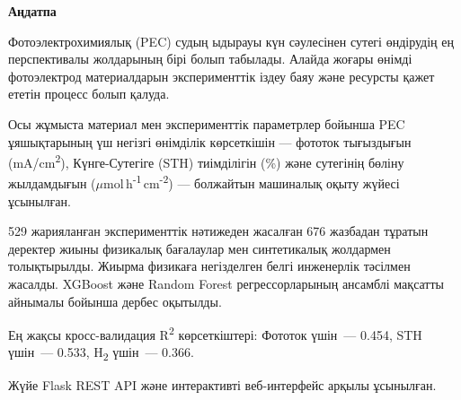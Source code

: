 \newpage
\pagestyle{plain}

{
\begin{center}
    \Large
    \textbf{Аңдатпа}
\end{center}

\vspace{0.5cm}

Фотоэлектрохимиялық (PEC) судың ыдырауы күн сәулесінен сутегі өндірудің ең перспективалы
жолдарының бірі болып табылады. Алайда жоғары өнімді фотоэлектрод материалдарын
эксперименттік іздеу баяу және ресурсты қажет ететін процесс болып қалуда.

Осы жұмыста материал мен эксперименттік параметрлер бойынша PEC ұяшықтарының үш
негізгі өнімділік көрсеткішін — фототок тығыздығын (mA/cm\textsuperscript{2}),
Күнге-Сутегіге (STH) тиімділігін (\%) және сутегінің бөліну жылдамдығын
($\mu$mol\,h\textsuperscript{-1}\,cm\textsuperscript{-2}) — болжайтын
машиналық оқыту жүйесі ұсынылған.

529 жарияланған эксперименттік нәтижеден жасалған 676 жазбадан тұратын деректер жиыны
физикалық бағалаулар мен синтетикалық жолдармен толықтырылды.
Жиырма физикаға негізделген белгі инженерлік тәсілмен жасалды.
XGBoost және Random Forest регрессорларының ансамблі мақсатты айнымалы бойынша
дербес оқытылды.

Ең жақсы кросс-валидация R\textsuperscript{2} көрсеткіштері:
Фототок үшін~— 0.454,
STH үшін~— 0.533,
H\textsubscript{2} үшін~— 0.366.

Жүйе Flask REST API және интерактивті веб-интерфейс арқылы ұсынылған.
}
